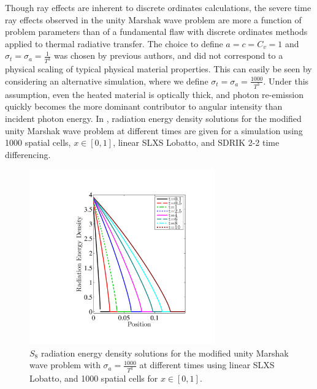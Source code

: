 Though ray effects are inherent to discrete ordinates calculations, the severe time ray effects observed in the unity Marshak wave problem are more a function of problem parameters than of a fundamental flaw with discrete ordinates methods applied to thermal radiative transfer.
The choice to define $a=c=C_v=1$ and $\sigma_t = \sigma_a = \frac{1}{T^3}$ was chosen by previous authors, and did not correspond to a physical scaling of typical physical material properties.
This can easily be seen by considering an alternative simulation, where we define $\sigma_t = \sigma_a = \frac{1000}{T^3}$.
Under this assumption, even the heated material is optically thick, and photon re-emission quickly becomes the more dominant contributor to angular intensity than incident photon energy.
In , radiation energy density solutions for the modified unity Marshak wave problem at different times are given for a simulation using 1000 spatial cells, $x\in[0,1]$, linear SLXS Lobatto, and SDRIK 2-2 time differencing.
\begin{figure}[!htp]
\centering
\includegraphics[width=8cm,trim=1in  0.5in 1in 0.75in,clip=true]{chapter6_grey_radtran/Dissertation_Data/More_Times_P1_S8_Time_Ray_Effects_Radiation_Cv1_SigA1000.pdf}
\caption{$S_{8}$ radiation energy density solutions for the modified unity Marshak wave problem with $\sigma_a = \frac{1000}{T^3}$ at different times using linear SLXS Lobatto, and 1000 spatial cells for $x\in[0,1]$.}
\label{fig:sig_a_1000_radiation}
\end{figure}

